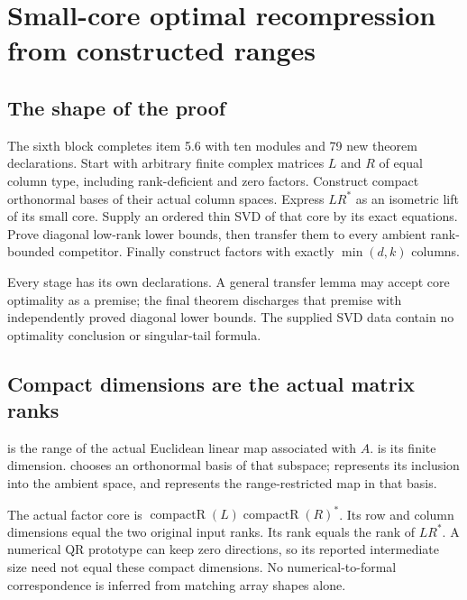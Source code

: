 \section{Small-core optimal recompression from constructed ranges}
\subsection{The shape of the proof}
The sixth block completes item 5.6 with ten modules and 79 new theorem declarations. Start with arbitrary finite complex matrices \(L\) and \(R\) of equal column type, including rank-deficient and zero factors. Construct compact orthonormal bases of their actual column spaces. Express \(LR^*\) as an isometric lift of its small core. Supply an ordered thin SVD of that core by its exact equations. Prove diagonal low-rank lower bounds, then transfer them to every ambient rank-bounded competitor. Finally construct factors with exactly \(\min(d,k)\) columns.

Every stage has its own declarations. A general transfer lemma may accept core optimality as a premise; the final theorem discharges that premise with independently proved diagonal lower bounds. The supplied SVD data contain no optimality conclusion or singular-tail formula.

\subsection{Compact dimensions are the actual matrix ranks}
 is the range of the actual Euclidean linear map associated with \(A\).  is its finite dimension.  chooses an orthonormal basis of that subspace;  represents its inclusion into the ambient space, and  represents the range-restricted map in that basis.

The actual factor core is \(\operatorname{compactR}(L)\operatorname{compactR}(R)^*\). Its row and column dimensions equal the two original input ranks. Its rank equals the rank of \(LR^*\). A numerical QR prototype can keep zero directions, so its reported intermediate size need not equal these compact dimensions. No numerical-to-formal correspondence is inferred from matching array shapes alone.

